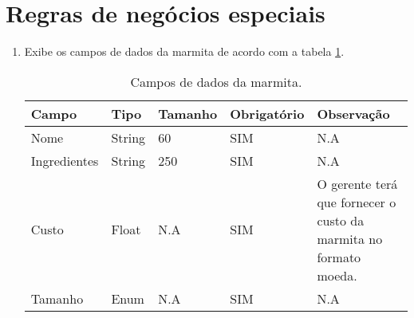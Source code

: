 \section{Regras de negócios especiais}

\begin{enumerate}[label=RN\arabic*]
	\item Exibe os campos de dados da marmita de acordo com a tabela \ref{uc005_tb_rn1}. \label{uc005_rn:1}
	\begin{table}[htb]
		\ABNTEXfontereduzida
		\caption[Campos de dados da marmita]{Campos de dados da marmita.}
		\label{uc005_tb_rn1}
		\begin{tabular}{|p{3.0cm}|p{2.0cm}|p{1.5cm}|p{2.0cm}|p{5.75cm}|}
			\hline
			\textbf{Campo} & \textbf{Tipo} & \textbf{Tamanho} & \textbf{Obrigatório} & \textbf{Observação}                                              \\ \hline
			Nome           & String        & 60               & SIM                  & N.A                                                              \\ \hline
			Ingredientes   & String        & 250              & SIM                  & N.A                                                              \\ \hline
			Custo          & Float         & N.A              & SIM                  & O gerente terá que fornecer o custo da marmita no formato moeda. \\ \hline
			Tamanho        & Enum          & N.A              & SIM                  & N.A                                                              \\ \hline
		\end{tabular}
	\end{table}
\end{enumerate}